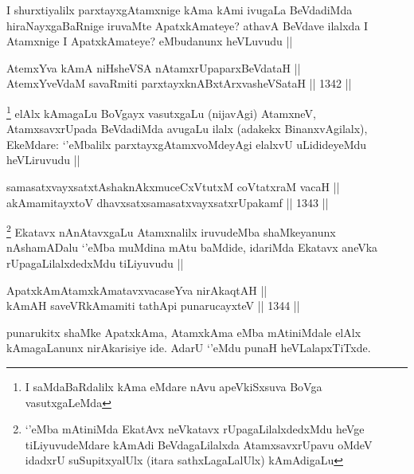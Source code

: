 \begin{artha}
I shurxtiyalilx parxtayxgAtamxnige kAma kAmi ivugaLa BeVdadiMda hiraNayxgaBaRnige iruvaMte ApatxkAmateye? athavA BeVdave ilalxda I Atamxnige I ApatxkAmateye? eMbudanunx heVLuvudu ||
\end{artha}

\begin{shl}
AtemxYva kAmA niHsheVSA nA\s \s tamxrUpaparxBeVdataH || \\
AtemxYveVdaM savaRmiti parxtayxknABxtArxvasheVSataH ||  1342 ||  
\end{shl}

\begin{artha}
\footnote{I saMdaBaRdalilx kAma eMdare nAvu apeVkiSxsuva BoVga vasutxgaLeMda}
elAlx kAmagaLu BoVgayx vasutxgaLu (nijavAgi) AtamxneV, AtamxsavxrUpada BeVdadiMda avugaLu ilalx (adakekx BinanxvAgilalx), EkeMdare: `\stext'eMbalilx parxtayxgAtamxvoMdeyAgi elalxvU uLidideyeMdu heVLiruvudu ||
\end{artha}


\begin{shl}
samasatxvayxsatxtAshaknAkxmuceCxVtutxM coVtatxraM vacaH || \\
akAmamitayxtoV dhavxsatxsamasatxvayxsatxrUpakamf ||  1343 ||  
\end{shl}

\begin{artha}
\footnote{`\stext'eMba mAtiniMda EkatAvx neVkatavx rUpagaLilalxdedxMdu heVge tiLiyuvudeMdare kAmAdi BeVdagaLilalxda AtamxsavxrUpavu oMdeV idadxrU suSupitxyalUlx (itara sathxLagaLalUlx) kAmAdigaLu}
Ekatavx nAnAtavxgaLu Atamxnalilx iruvudeMba shaMkeyanunx nAshamADalu `\stext'eMba muMdina mAtu baMdide, idariMda Ekatavx aneVka rUpagaLilalxdedxMdu tiLiyuvudu ||
\end{artha}

\begin{shl}
ApatxkAmAtamxkAmatavxvacaseYva nirAkaqtAH || \\
kAmAH saveVR\s kAmamiti tathA\s pi punarucayxteV ||  1344 ||  
\end{shl}

\begin{artha}
punarukitx shaMke ApatxkAma, AtamxkAma eMba mAtiniMdale elAlx kAmagaLanunx nirAkarisiye ide. AdarU `\stext'eMdu punaH heVLalapxTiTxde.
\end{artha}


